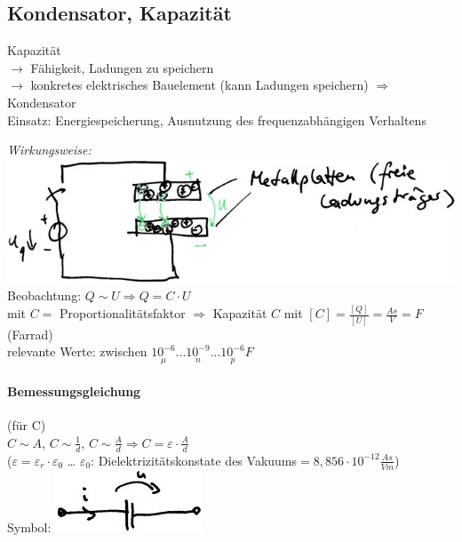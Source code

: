 \subsection{Kondensator, Kapazität}

Kapazität \\
$\rightarrow$ Fähigkeit, Ladungen zu speichern\\
$\rightarrow$ konkretes elektrisches Bauelement (kann Ladungen speichern) $\Rightarrow$ Kondensator \medskip\\
Einsatz: Energiespeicherung, Ausnutzung des frequenzabhängigen Verhaltens

\emph{Wirkungsweise:}\\
\includegraphics[scale=.75]{Abbildungen/ABB406}\\
Beobachtung: $Q\sim U \Rightarrow Q=C\cdot U$ \\
mit $C = $ Proportionalitätsfaktor $\Rightarrow$ Kapazität $C$ mit $[C]=\frac{[Q]}{[U]}=\frac{As}{V}=F$ (Farrad)\\
relevante Werte: zwischen $\underset{\mu}{10^{-6}}... \underset{n}{10^{-9}}...\underset{p}{10^{-6}}F$
\paragraph{Bemessungsgleichung} (für C)\\
$C \sim A$, $C\sim \frac{1}{d}$, $C\sim  \frac{A}{d} \Rightarrow C=\varepsilon \cdot \frac{A}{d}$ \\
($\varepsilon = \varepsilon_r \cdot \varepsilon_0$ … $\varepsilon_0$: Dielektrizitätskonstate des Vakuums$=8,856\cdot 10^{-12}\frac{As}{Vm}$)\\
Symbol: \includegraphics[scale=.75]{Abbildungen/ABB407}
